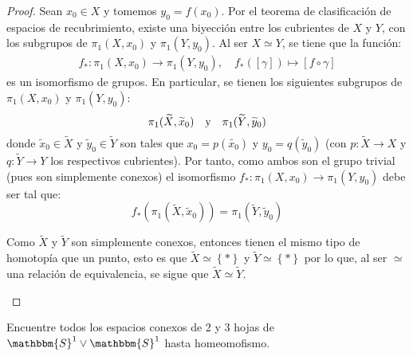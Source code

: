 \documentclass[12pt]{report}
\newcounter{it}
\theoremstyle{largebreak}
\newcommand\cf[3]{\ensuremath{#1:#2\rightarrow#3}}
\newcommand{\bbm}[1]{\ensuremath{\mathbbm{#1}}}
\begin{document}
    \begin{proof}
        Sean $x_0\in X$ y tomemos $y_0=f(x_0)$. Por el teorema de clasificación de espacios de recubrimiento, existe una biyección entre los cubrientes de $X$ y $Y$, con los subgrupos de $\pi_1(X,x_0)$ y $\pi_1(Y,y_0)$. Al ser $X\simeq Y$, se tiene que la función:
        \begin{equation*}
            \begin{split}
                \cf{f_*}{\pi_1(X,x_0)}{\pi_1(Y,y_0)},\quad f_*([\gamma])\mapsto[f\circ\gamma]
            \end{split}
        \end{equation*}
        es un isomorfismo de grupos. En particular, se tienen los siguientes subgrupos de $\pi_1(X,x_0)$ y $\pi_1(Y,y_0)$:
        \begin{equation*}
            \pi_1(\widetilde{X},\widetilde{x}_0)\quad\textup{y}\quad\pi_1(\widetilde{Y},\widetilde{y}_0)
        \end{equation*}
        donde $\widetilde{x}_0\in\widetilde{X}$ y $\widetilde{y}_0\in\widetilde{Y}$ son tales que $x_0=p(\widetilde{x_0})$ y $y_0=q(\widetilde{y}_0)$ (con $\cf{p}{\widetilde{X}}{X}$ y $\cf{q}{\widetilde{Y}}{Y}$ los respectivos cubrientes).
        Por tanto, como ambos son el grupo trivial (pues son simplemente conexos) el isomorfismo $\cf{f_*}{\pi_1(X,x_0)}{\pi_1(Y,y_0)}$ debe ser tal que:
        \begin{equation*}
            f_*(\pi_1(\widetilde{X},\widetilde{x}_0))=\pi_1(\widetilde{Y},\widetilde{y}_0)
        \end{equation*}

        \begin{obs}
            Como $\widetilde{X}$ y $\widetilde{Y}$ son simplemente conexos, entonces tienen el mismo tipo de homotopía que un punto, esto es que $\widetilde{X}\simeq\left\{*\right\}$ y $\widetilde{Y}\simeq\left\{*\right\}$ por lo que, al ser $\simeq$ una relación de equivalencia, se sigue que $\widetilde{X}\simeq\widetilde{Y}$.
        \end{obs}
    \end{proof}

    \begin{excer}
        Encuentre todos los espacios conexos de 2 y 3 hojas de $\bbm{S}^1\lor\bbm{S}^1$ hasta homeomofismo.
    \end{excer}

    \begin{sol}
        
    \end{sol}
\end{document}
